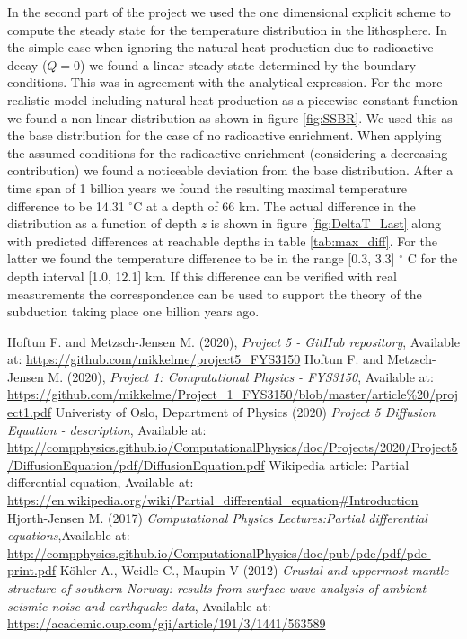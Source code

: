 \documentclass[%
 reprint,
nofootinbib,
aps,
]{revtex4-1}
\begin{document}
In the second part of the project we used the one dimensional explicit scheme to compute the steady state for the temperature distribution in the lithosphere. In the simple case when ignoring the natural heat production due to radioactive decay ($Q = 0$) we found a linear steady state determined by the boundary conditions. This was in agreement with the analytical expression. For the more realistic model including natural heat production as a piecewise constant function we found a non linear distribution as shown in figure \ref{fig:SSBR}. We used this as the base distribution for the case of no radioactive enrichment. When applying the assumed conditions for the radioactive enrichment (considering a decreasing contribution) we found a noticeable deviation from the base distribution. After a time span of 1 billion years we found the resulting maximal temperature difference to be 14.31 $^{\circ}$C at a depth of 66 km. The actual difference in the distribution as a function of depth $z$ is shown in figure \ref{fig:DeltaT_Last} along with predicted differences at reachable depths in table \ref{tab:max_diff}. For the latter we found the temperature difference to be in the range [0.3, 3.3] $^{\circ}$ C for the depth interval [1.0, 12.1] km. If this difference can be verified with real measurements the correspondence can be used to support the theory of the subduction taking place one billion years ago.

\clearpage

\begin{thebibliography}{}
 Hoftun F. and Metzsch-Jensen M. (2020), \textit{Project 5 - GitHub repository}, Available at: \url{https://github.com/mikkelme/project5_FYS3150}
 Hoftun F. and Metzsch-Jensen M. (2020), \textit{Project 1: Computational Physics - FYS3150}, Available at: \url{https://github.com/mikkelme/Project_1_FYS3150/blob/master/article%20/project1.pdf}
 Univeristy of Oslo, Department of Physics (2020) \textit{Project 5 Diffusion Equation - description}, Available at: \url{http://compphysics.github.io/ComputationalPhysics/doc/Projects/2020/Project5/DiffusionEquation/pdf/DiffusionEquation.pdf}
 Wikipedia article: Partial differential equation, Available at: \url{https://en.wikipedia.org/wiki/Partial_differential_equation#Introduction}
 Hjorth-Jensen M. (2017) \textit{Computational Physics Lectures:Partial differential equations},Available at: \url{http://compphysics.github.io/ComputationalPhysics/doc/pub/pde/pdf/pde-print.pdf}
 Köhler A., Weidle C., Maupin V (2012) \textit{Crustal and uppermost mantle structure of southern Norway: results from surface wave analysis of ambient seismic noise and earthquake data}, Available at: \url{https://academic.oup.com/gji/article/191/3/1441/563589}

\end{thebibliography}
\end{document}
